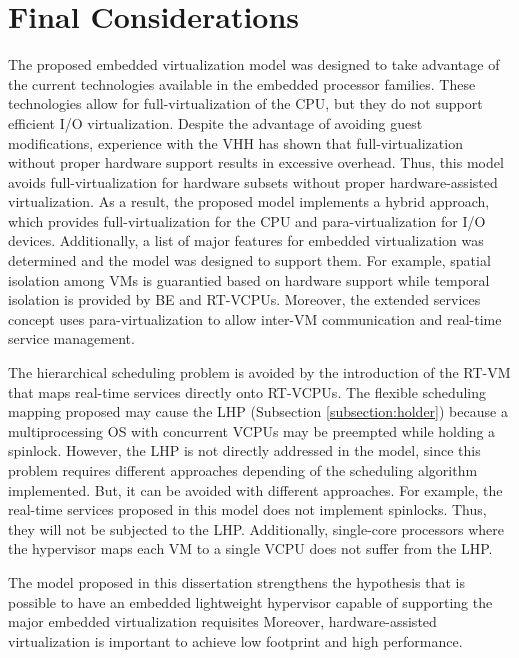 \section{Final Considerations}
\label{section:final4}

The proposed embedded virtualization model was designed to take advantage of the current technologies available in the embedded processor families. These technologies allow for full-virtualization of the CPU, but they do not support efficient I/O virtualization. Despite the advantage of avoiding guest modifications, experience with the VHH has shown that full-virtualization without proper hardware support results in excessive overhead. Thus, this model avoids full-virtualization for hardware subsets without proper hardware-assisted virtualization. As a result, the proposed model implements a hybrid approach, which provides full-virtualization for the CPU and para-virtualization for I/O devices. Additionally, a list of major features for embedded virtualization was determined and the model was designed to support them. For example, spatial isolation among VMs is guarantied based on hardware support while temporal isolation is provided by BE and RT-VCPUs. Moreover, the extended services concept uses para-virtualization to allow inter-VM communication and real-time service management.

The hierarchical scheduling problem is avoided by the introduction of the RT-VM that maps real-time services directly onto RT-VCPUs. The flexible scheduling mapping proposed may cause the LHP (Subsection \ref{subsection:holder}) because a multiprocessing OS with concurrent VCPUs may be preempted while holding a spinlock. However, the LHP is not directly addressed in the model, since this problem requires different approaches depending of the scheduling algorithm implemented. But, it can be avoided with different approaches. For example, the real-time services proposed in this model does not implement spinlocks. Thus, they will not be subjected to the LHP. Additionally, single-core processors where the hypervisor maps each VM to a single VCPU does not suffer from the LHP.

The model proposed in this dissertation strengthens the hypothesis that is possible to have an embedded lightweight hypervisor capable of supporting the major embedded virtualization requisites Moreover, hardware-assisted virtualization is important to achieve low footprint and high performance. 


